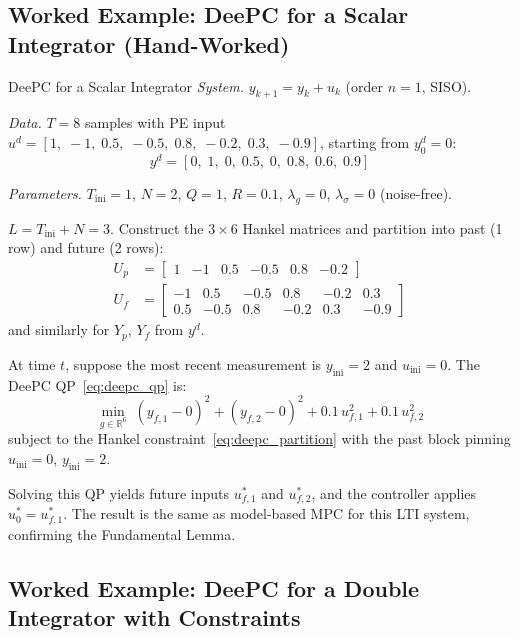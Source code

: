 \subsection{Worked Example: DeePC for a Scalar Integrator (Hand-Worked)}
\label{sec:deepc_scalar}

\begin{examplebox}{DeePC for a Scalar Integrator}
	\emph{System.} $y_{k+1} = y_k + u_k$ (order $n = 1$, SISO).

	\emph{Data.} $T = 8$ samples with PE input $u^d = [1,\; -1,\; 0.5,\; -0.5,\; 0.8,\; -0.2,\; 0.3,\; -0.9]$, starting from $y_0^d = 0$:
	\[
	y^d = [0,\; 1,\; 0,\; 0.5,\; 0,\; 0.8,\; 0.6,\; 0.9]
	\]

	\emph{Parameters.} $T_\text{ini} = 1$, $N = 2$, $Q = 1$, $R = 0.1$, $\lambda_g = 0$, $\lambda_\sigma = 0$ (noise-free).

	\solution

	$L = T_\text{ini} + N = 3$. Construct the $3 \times 6$ Hankel matrices and partition into past (1 row) and future (2 rows):
	\begin{align*}
		U_p &= \begin{bmatrix} 1 & -1 & 0.5 & -0.5 & 0.8 & -0.2 \end{bmatrix} \\
		U_f &= \begin{bmatrix} -1 & 0.5 & -0.5 & 0.8 & -0.2 & 0.3 \\ 0.5 & -0.5 & 0.8 & -0.2 & 0.3 & -0.9 \end{bmatrix}
	\end{align*}
	and similarly for $Y_p$, $Y_f$ from $y^d$.

	At time $t$, suppose the most recent measurement is $y_\text{ini} = 2$ and $u_\text{ini} = 0$. The DeePC QP~\eqref{eq:deepc_qp} is:
	\[
	\min_{g \in \mathbb{R}^6}\; (y_{f,1} - 0)^2 + (y_{f,2} - 0)^2 + 0.1\,u_{f,1}^2 + 0.1\,u_{f,2}^2
	\]
	subject to the Hankel constraint~\eqref{eq:deepc_partition} with the past block pinning $u_\text{ini} = 0$, $y_\text{ini} = 2$.

	Solving this QP yields future inputs $u_{f,1}^*$ and $u_{f,2}^*$, and the controller applies $u_0^* = u_{f,1}^*$. The result is the same as model-based MPC for this LTI system, confirming the Fundamental Lemma.
\end{examplebox}


\subsection{Worked Example: DeePC for a Double Integrator with Constraints}
\label{sec:deepc_double_int}

